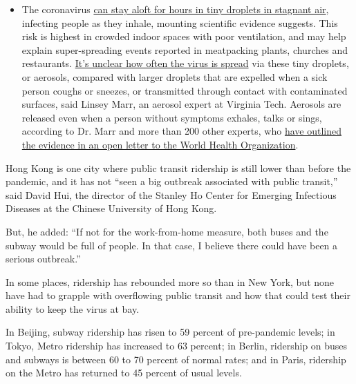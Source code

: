 \begin{itemize}
  \begin{itemize}
  \tightlist
  \item
    The coronavirus
    \href{https://www.nytimes.com/2020/07/04/health/239-experts-with-one-big-claim-the-coronavirus-is-airborne.html?action=click\&pgtype=Article\&state=default\&region=MAIN_CONTENT_3\&context=storylines_faq}{can
    stay aloft for hours in tiny droplets in stagnant air}, infecting
    people as they inhale, mounting scientific evidence suggests. This
    risk is highest in crowded indoor spaces with poor ventilation, and
    may help explain super-spreading events reported in meatpacking
    plants, churches and restaurants.
    \href{https://www.nytimes.com/2020/07/06/health/coronavirus-airborne-aerosols.html?action=click\&pgtype=Article\&state=default\&region=MAIN_CONTENT_3\&context=storylines_faq}{It's
    unclear how often the virus is spread} via these tiny droplets, or
    aerosols, compared with larger droplets that are expelled when a
    sick person coughs or sneezes, or transmitted through contact with
    contaminated surfaces, said Linsey Marr, an aerosol expert at
    Virginia Tech. Aerosols are released even when a person without
    symptoms exhales, talks or sings, according to Dr. Marr and more
    than 200 other experts, who
    \href{https://academic.oup.com/cid/article/doi/10.1093/cid/ciaa939/5867798}{have
    outlined the evidence in an open letter to the World Health
    Organization}.
  \end{itemize}
\end{itemize}

Hong Kong is one city where public transit ridership is still lower than
before the pandemic, and it has not ``seen a big outbreak associated
with public transit,'' said David Hui, the director of the Stanley Ho
Center for Emerging Infectious Diseases at the Chinese University of
Hong Kong.

But, he added: ``If not for the work-from-home measure, both buses and
the subway would be full of people. In that case, I believe there could
have been a serious outbreak.''

In some places, ridership has rebounded more so than in New York, but
none have had to grapple with overflowing public transit and how that
could test their ability to keep the virus at bay.

In Beijing, subway ridership has risen to 59 percent of pre-pandemic
levels; in Tokyo, Metro ridership has increased to 63 percent; in
Berlin, ridership on buses and subways is between 60 to 70 percent of
normal rates; and in Paris, ridership on the Metro has returned to 45
percent of usual levels.

